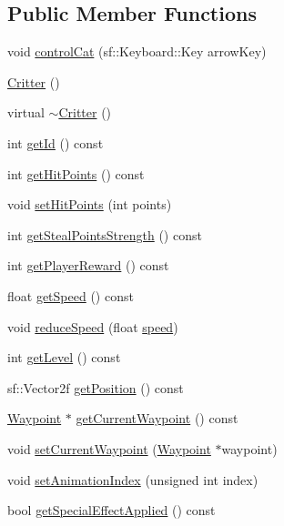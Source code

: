 \subsection*{Public Member Functions}
\begin{DoxyCompactItemize}
\item 
void \hyperlink{class_critter_a628b203e25050a085786d3993a660ab9}{control\+Cat} (sf\+::\+Keyboard\+::\+Key arrow\+Key)
\item 
\hyperlink{class_critter_a05aa21e3b570d7380f3ead47c99442ef}{Critter} ()
\item 
virtual \hyperlink{class_critter_aa923c19cdc302c7bf10a038983e801c1}{$\sim$\+Critter} ()
\item 
int \hyperlink{class_critter_a5636f0ed2f067318e0d361fe31c9eff2}{get\+Id} () const 
\item 
int \hyperlink{class_critter_a1e98c05f5a41102cc37eb7a4396b90cf}{get\+Hit\+Points} () const 
\item 
void \hyperlink{class_critter_adca76b21049a0bdd0b3e1505996c71ea}{set\+Hit\+Points} (int points)
\item 
int \hyperlink{class_critter_ac57f38074517fa1cc481380aaff1ed85}{get\+Steal\+Points\+Strength} () const 
\item 
int \hyperlink{class_critter_a7db2281b14479a1c931716c07acbc7da}{get\+Player\+Reward} () const 
\item 
float \hyperlink{class_critter_a3785ffa05cec86b30264fbdbf613e4f8}{get\+Speed} () const 
\item 
void \hyperlink{class_critter_ae843395fb1106cd2c550cd9be9f14df0}{reduce\+Speed} (float \hyperlink{class_critter_adde7d84a0dd9ac8f5dc144464928638f}{speed})
\item 
int \hyperlink{class_critter_aebbb372bdcd3a709428445554c3d24c9}{get\+Level} () const 
\item 
sf\+::\+Vector2f \hyperlink{class_critter_a8fdba06ecb582e8b542e2e73a76f455d}{get\+Position} () const 
\item 
\hyperlink{class_waypoint}{Waypoint} $\ast$ \hyperlink{class_critter_a8a95119a0531e9372aa6a2a95b61edde}{get\+Current\+Waypoint} () const 
\item 
void \hyperlink{class_critter_a394069b23bdd1fd4f8caeab41b23c83d}{set\+Current\+Waypoint} (\hyperlink{class_waypoint}{Waypoint} $\ast$waypoint)
\item 
void \hyperlink{class_critter_abe76d86eb653909910ee956195a16aec}{set\+Animation\+Index} (unsigned int index)
\item 
bool \hyperlink{class_critter_aaf084b7cd4ffaa632454ee363723db92}{get\+Special\+Effect\+Applied} () const 

\end{DoxyCompactItemize}

